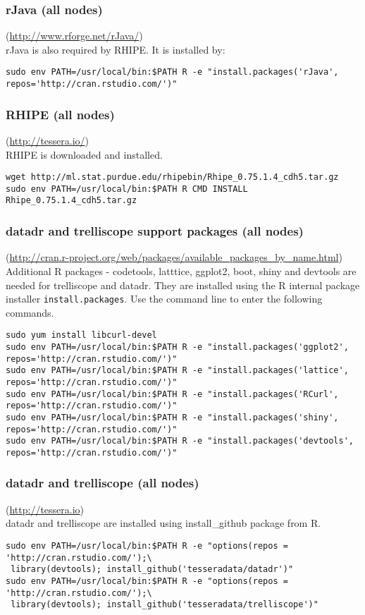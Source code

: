 \subsubsection{rJava (all nodes)}(\url{http://www.rforge.net/rJava/})\\
rJava is also required by RHIPE.  It is installed by:

\begin{verbatim}
sudo env PATH=/usr/local/bin:$PATH R -e "install.packages('rJava', repos='http://cran.rstudio.com/')"
\end{verbatim}

\subsubsection{RHIPE (all nodes)}(\url{http://tessera.io/})\\
RHIPE is downloaded and installed.
\begin{verbatim}
wget http://ml.stat.purdue.edu/rhipebin/Rhipe_0.75.1.4_cdh5.tar.gz
sudo env PATH=/usr/local/bin:$PATH R CMD INSTALL Rhipe_0.75.1.4_cdh5.tar.gz
\end{verbatim}

\subsubsection{datadr and trelliscope support packages (all nodes)}(\url{http://cran.r-project.org/web/packages/available\_packages\_by\_name.html})\\
Additional R packages - codetools, latttice, ggplot2, boot, shiny and devtools are needed for trelliscope and datadr. They are installed using the R internal package installer \verb|install.packages|. Use the command line to enter the following commands. 
\begin{verbatim}
sudo yum install libcurl-devel
sudo env PATH=/usr/local/bin:$PATH R -e "install.packages('ggplot2', repos='http://cran.rstudio.com/')"
sudo env PATH=/usr/local/bin:$PATH R -e "install.packages('lattice', repos='http://cran.rstudio.com/')"
sudo env PATH=/usr/local/bin:$PATH R -e "install.packages('RCurl', repos='http://cran.rstudio.com/')"
sudo env PATH=/usr/local/bin:$PATH R -e "install.packages('shiny', repos='http://cran.rstudio.com/')"
sudo env PATH=/usr/local/bin:$PATH R -e "install.packages('devtools', repos='http://cran.rstudio.com/')"
\end{verbatim}

\subsubsection{datadr and trelliscope (all nodes)}(\url{http://tessera.io})\\
datadr and trelliscope are installed using install\_github package from R. 
\begin{verbatim}
sudo env PATH=/usr/local/bin:$PATH R -e "options(repos = 'http://cran.rstudio.com/');\
 library(devtools); install_github('tesseradata/datadr')"
sudo env PATH=/usr/local/bin:$PATH R -e "options(repos = 'http://cran.rstudio.com/');\
 library(devtools); install_github('tesseradata/trelliscope')"
\end{verbatim}

